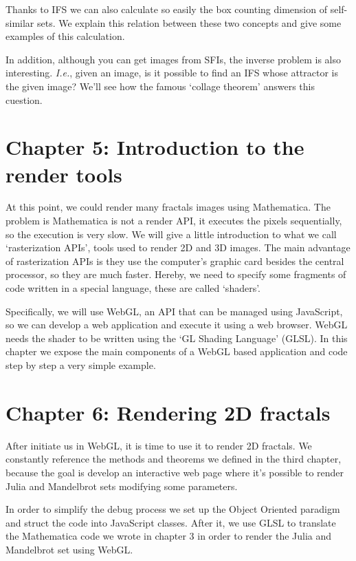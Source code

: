 Thanks to IFS we can also calculate so easily the box counting dimension of self-similar sets. We explain this relation between these two concepts and give some examples of this calculation.

In addition, although you can get images from SFIs, the inverse problem is also interesting. \textit{I.e.}, given an image, is it possible to find an IFS whose attractor is the given image? We'll see how the famous `collage theorem' answers this cuestion.

\section*{Chapter 5: Introduction to the render tools}

At this point, we could render many fractals images using Mathematica. The problem is Mathematica is not a render API, it executes the pixels sequentially, so the execution is very slow. We will give a little introduction to what we call `rasterization APIs', tools used to render 2D and 3D images. The main advantage of rasterization APIs is they use the computer's graphic card besides the central processor, so they are much faster. Hereby, we need to specify some fragments of code written in a special language, these are called `shaders'. 

Specifically, we will use WebGL, an API that can be managed using JavaScript, so we can develop a web application and execute it using a web browser. WebGL needs the shader to be written using the `GL Shading Language' (GLSL). In this chapter we expose the main components of a WebGL based application and code step by step a very simple example.

\section*{Chapter 6: Rendering 2D fractals}

After initiate us in WebGL, it is time to use it to render 2D fractals. We constantly reference the methods and theorems we defined in the third chapter, because the goal is develop an interactive web page where it's possible to render Julia and Mandelbrot sets modifying some parameters.

In order to simplify the debug process we set up the Object Oriented paradigm and struct the code into JavaScript classes. After it, we use GLSL to translate the Mathematica code we wrote in chapter 3 in order to render the Julia and Mandelbrot set using WebGL.

